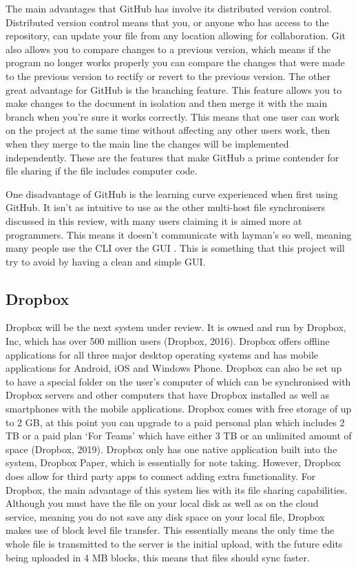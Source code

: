 \documentclass[11pt]{article}
\begin{document}
The main advantages that GitHub has involve its distributed version control. Distributed version control means that you, or anyone who has access to the repository, can update your file from any location allowing for collaboration. Git also allows you to compare changes to a previous version, which means if the program no longer works properly you can compare the changes that were made to the previous version to rectify or revert to the previous version. The other great advantage for GitHub is the branching feature. This feature allows you to make changes to the document in isolation and then merge it with the main branch when you’re sure it works correctly. This means that one user can work on the project at the same time without affecting any other users work, then when they merge to the main line the changes will be implemented independently. These are the features that make GitHub a prime contender for file sharing if the file includes computer code.

One disadvantage of GitHub is the learning curve experienced when first using GitHub. It isn’t as intuitive to use as the other multi-host file synchronisers discussed in this review, with many users claiming it is aimed more at programmers. This means it doesn’t communicate with layman’s so well, meaning many people use the CLI  over the GUI . This is something that this project will try to avoid by having a clean and simple GUI.  

\subsection{Dropbox}

Dropbox will be the next system under review. It is owned and run by Dropbox, Inc, which has over 500 million users (Dropbox, 2016). Dropbox offers offline applications for all three major desktop operating systems and has mobile applications for Android, iOS and Windows Phone. Dropbox can also be set up to have a special folder on the user’s computer of which can be synchronised with Dropbox servers and other computers that have Dropbox installed as well as smartphones with the mobile applications. Dropbox comes with free storage of up to 2 GB, at this point you can upgrade to a paid personal plan which includes 2 TB or a paid plan ‘For Teams’ which have either 3 TB or an unlimited amount of space (Dropbox, 2019). Dropbox only has one native application built into the system, Dropbox Paper, which is essentially for note taking. However, Dropbox does allow for third party apps to connect adding extra functionality.
For Dropbox, the main advantage of this system lies with its file sharing capabilities. Although you must have the file on your local disk as well as on the cloud service, meaning you do not save any disk space on your local file, Dropbox makes use of block level file transfer. This essentially means the only time the whole file is transmitted to the server is the initial upload, with the future edits being uploaded in 4 MB blocks, this means that files should sync faster.
\end{document}
